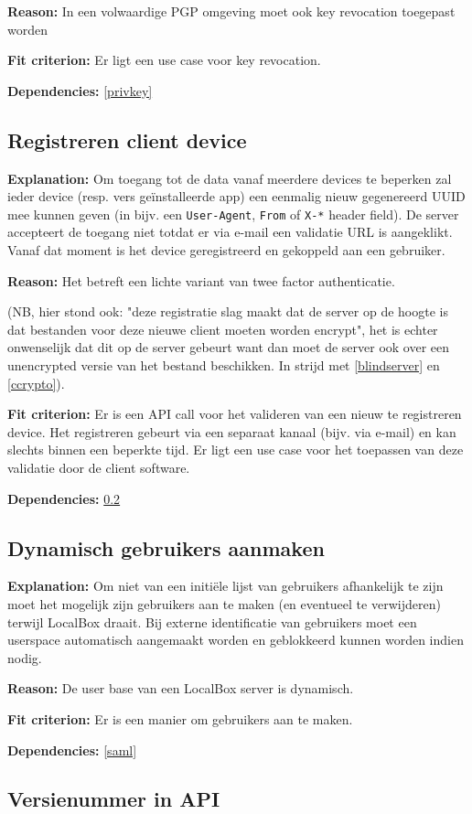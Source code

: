 \documentclass[[11pt,a4paper]{article}
\newcommand\requirement[2]{\subsection{#2}\label{#1}}
\newcommand\explanation{\noindent\textbf{Explanation: }}
\newcommand\reason{\noindent\textbf{Reason: }}
\newcommand\criterion{\noindent\textbf{Fit criterion: }}
\newcommand\dependencies{\noindent\textbf{Dependencies: }}
\begin{document}
    \reason In een volwaardige PGP omgeving moet ook key revocation toegepast worden
    
    \criterion Er ligt een use case voor key revocation.

    \dependencies \ref{privkey}

    
\requirement{clientreg}{Registreren client device}

    \explanation Om toegang tot de data vanaf meerdere devices te beperken zal ieder device (resp. vers ge\"{i}nstalleerde app) een eenmalig nieuw gegenereerd UUID mee kunnen geven (in bijv. een \texttt{User-Agent}, \texttt{From} of \texttt{X-*} header field). De server accepteert de toegang niet totdat er via e-mail een validatie URL is aangeklikt. Vanaf dat moment is het device geregistreerd en gekoppeld aan een gebruiker. 
    
    \reason Het betreft een lichte variant van twee factor authenticatie. 
    
    (NB, hier stond ook: "deze registratie slag maakt dat de server op de hoogte is dat bestanden voor deze nieuwe client moeten worden encrypt", het is echter onwenselijk dat dit op de server gebeurt want dan moet de server ook over een unencrypted versie van het bestand beschikken. In strijd met \ref{blindserver} en \ref{ccrypto}).
    
    \criterion Er is een API call voor het valideren van een nieuw te registreren device. Het registreren gebeurt via een separaat kanaal (bijv. via e-mail) en kan slechts binnen een beperkte tijd. Er ligt een use case voor het toepassen van deze validatie door de client software.
    
    \dependencies \ref{adminuser}


\requirement{adminuser}{Dynamisch gebruikers aanmaken}

    \explanation Om niet van een initi\"{e}le lijst van gebruikers afhankelijk te zijn moet het mogelijk zijn gebruikers aan te maken (en eventueel te verwijderen) terwijl LocalBox draait. Bij externe identificatie van gebruikers moet een userspace automatisch aangemaakt worden en geblokkeerd kunnen worden indien nodig.

    \reason De user base van een LocalBox server is dynamisch.  

    \criterion Er is een manier om gebruikers aan te maken.

    \dependencies \ref{saml}


\requirement{versienummer}{Versienummer in API}
\end{document}

